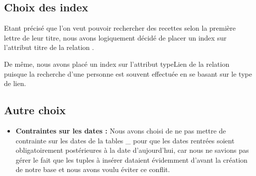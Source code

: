 \documentclass[a4paper,10pt]{report}
\begin{document}
\subsection{Choix des index}

Etant précisé que l'on veut pouvoir rechercher des recettes selon la première lettre de leur titre, nous avons logiquement décidé de placer un index sur l'attribut titre de la relation .

De même, nous avons placé un index sur l'attribut typeLien de la relation  puisque la recherche d’une personne est souvent effectuée en se basant sur le type de lien.

\subsection{Autre choix}
\begin{itemize}
\item \textbf{Contraintes sur les dates : } Nous avons choisi de ne pas mettre de contrainte sur les dates de la tables \_ pour que les dates rentrées soient obligatoirement postérieures à la date d'aujourd'hui, car nous ne savions pas gérer le fait que les tuples à insérer dataient évidemment d'avant la création de notre base et nous avons voulu éviter ce conflit.
\end{itemize}

\end{document}
